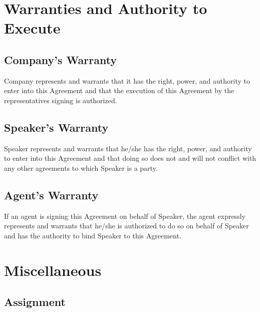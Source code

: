 \documentclass[a4paper,12pt]{article} %
\begin{document}

\section{Warranties and Authority to Execute}

\subsection{Company's Warranty}

Company represents and warrants that it has the right, power, and authority to enter into this Agreement and that the execution of this Agreement by the representatives signing is authorized.

\subsection{Speaker's Warranty}

Speaker represents and warrants that he/she has the right, power, and authority to enter into this Agreement and that doing so does not and will not conflict with any other agreements to which Speaker is a party.

\subsection{Agent's Warranty}

If an agent is signing this Agreement on behalf of Speaker, the agent expressly represents and warrants that he/she is authorized to do so on behalf of Speaker and has the authority to bind Speaker to this Agreement.



\section{Miscellaneous}

\subsection{Assignment}
\end{document}
